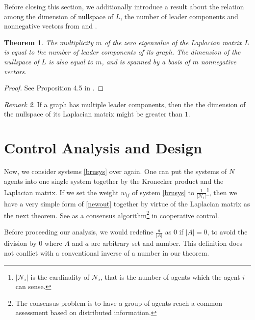 \documentclass[11pt, a4paper, oneside, openany, reqno]{book}
\newtheorem{theorem}{Theorem}[chapter]
\theoremstyle{definition}
\theoremstyle{remark}
\newtheorem{remark}[theorem]{Remark}
\numberwithin{equation}{chapter} %
\newcommand{\NBR}{\mathcal{N}}
\begin{document}
	
Before closing this section, we additionally introduce a result about the relation 
among the dimension of nullspace of $ L $, the number of leader components 
and nonnegative vectors from \cite{faxthesis} and \cite{roth}. 

\begin{theorem}
	The multiplicity $ m $ of the zero eigenvalue of the Laplacian matrix $ L $ is 
	equal to the number of leader components of its graph. The dimension of the nullspace of $ L $
	is also equal to $ m $, and is spanned by a basis of $ m $ nonnegative vectors.
\end{theorem}

\begin{proof}See Proposition 4.5 in \cite{faxthesis}.\end{proof}

\begin{remark}
	If a graph has multiple leader components, 
	then the the dimension of the nullspace of its Laplacian matrix 
	might be greater than $ 1 $.
\end{remark}


\section{Control Analysis and Design}

Now, we consider systems \eqref{brusys} over again. 
One can put the systems of $ N $ agents into one single system together 
by the Kronecker product and the Laplacian matrix.
If we set the weight $ w_{ij} $ of system \eqref{brusys} 
to $ \frac{1}{\vert \NBR_i \vert} $\footnote
{$ \vert \NBR_i \vert $ is the cardinality of $ \NBR_i $, 
that is the number of agents which the agent $ i $ can sense.}, 
then we have a very simple form of \eqref{newout} 
together by virtue of the Laplacian matrix as the next theorem.
See \cite{fax} as a consensus algorithm\footnote{The consensus problem is 
to have a group of agents reach a common assessment based on distributed information.} 
in cooperative control.

Before proceeding our analysis, we would redefine $ \frac{a}{\vert A \vert } $
as $ 0 $ if $ \vert A \vert =0 $,
to avoid the division by $ 0 $ where $ A $ and $ a $ are arbitrary set and number.
This definition does not conflict with a conventional inverse of a number in our theorem.
\end{document}
